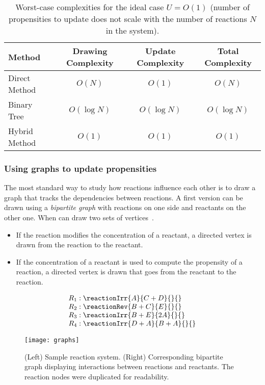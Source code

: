 \begin{table}[!h]
  \centering
  \begin{tabular}{|l|c|c|c|}
    \hline
    Method & Drawing Complexity & Update Complexity & Total Complexity\\
    \hline
    Direct Method & $O(N)$ & $O(1)$ & $O(N)$\\
    Binary Tree & $O(\log N)$ & $O(\log N)$ & $O(\log N)$\\
    Hybrid Method & $O(1)$ & $O(1)$ & $O(1)$\\
    \hline
  \end{tabular}
  \caption{Worst-case complexities for the ideal case $U=O(1)$ (number of propensities to update does not scale with the number of reactions $N$ in the system).}
  \label{tab:ideal_update}
\end{table}

\subsubsection{Using graphs to update propensities}

The most standard way to study how reactions influence each other is to draw a graph that tracks the dependencies between reactions. A first version can be drawn using a \emph{bipartite graph} with reactions on one side and reactants on the other one. When can draw two sets of vertices~.
\begin{itemize}
  \item If the reaction modifies the concentration of a reactant, a directed vertex is drawn from the reaction to the reactant.
  \item If the concentration of a reactant is used to compute the propensity of a reaction, a directed vertex is drawn that goes from the reactant to the reaction.
\end{itemize}

\begin{figure}[!h]
  \centering
  \begin{minipage}{0.39\textwidth}
    \[
    \begin{array}{l}
      R_1:\reactionIrr{A}{C+D}{}{} \\
      R_2:\reactionRev{B+C}{E}{}{} \\
      R_3:\reactionIrr{B+E}{2A}{}{} \\
      R_4:\reactionIrr{D+A}{B+A}{}{}
    \end{array}
    \]
  \end{minipage}
  \begin{minipage}{0.59\textwidth}
    \texttt{[image: graphs]}
  \end{minipage}
  \caption{(Left) Sample reaction system. (Right) Corresponding bipartite graph displaying interactions between reactions and reactants. The reaction nodes were duplicated for readability.}
  \label{fig:reactant_reaction_graph}
\end{figure}

